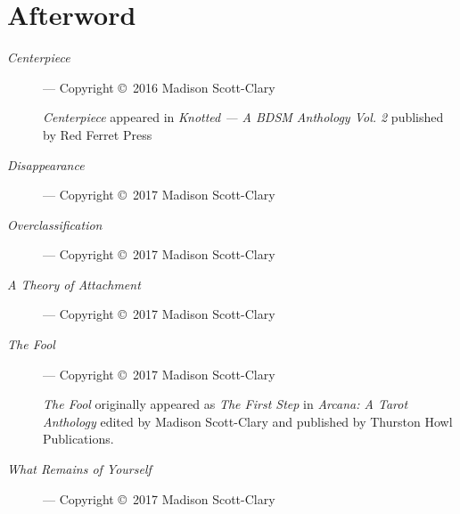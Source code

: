 \chapter*{Afterword}

\begin{description}
    \item[\emph{Centerpiece}]
    --- Copyright ©~2016 Madison Scott-Clary

    \emph{Centerpiece} appeared in \emph{Knotted --- A BDSM Anthology Vol. 2} published by Red Ferret Press
    \item[\emph{Disappearance}]
    --- Copyright ©~2017 Madison Scott-Clary
    \item[\emph{Overclassification}]
    --- Copyright ©~2017 Madison Scott-Clary
    \item[\emph{A Theory of Attachment}]
    --- Copyright ©~2017 Madison Scott-Clary
    \item[\emph{The Fool}]
    --- Copyright ©~2017 Madison Scott-Clary

    \emph{The Fool} originally appeared as \emph{The First Step} in \emph{Arcana: A Tarot Anthology} edited by Madison Scott-Clary and published by Thurston Howl Publications.
    \item[\emph{What Remains of Yourself}]
    --- Copyright ©~2017 Madison Scott-Clary
\end{description}
